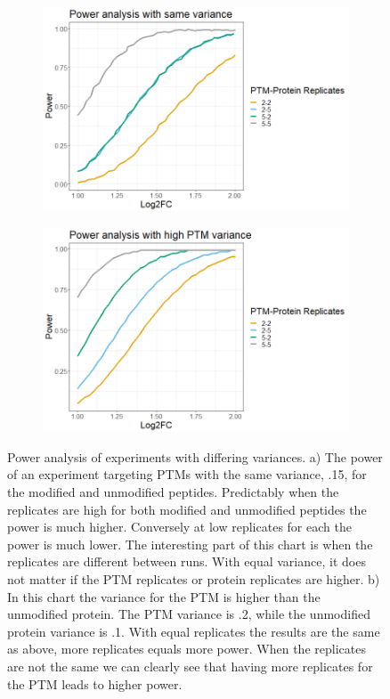 \documentclass[mcp]{article}
\numberwithin{table}{section}
\begin{document}
\begin{figure}[h!]
\centering
 \begin{subfigure}{\textwidth}
 \centering
	\includegraphics[width=.75\textwidth]{images/same_var_power}
	\caption{}
 \end{subfigure}\vspace{5mm}
 \begin{subfigure}{\textwidth}
 \centering
	\includegraphics[width=.75\textwidth]{images/high_ptm_var_power}
	\caption{}
 \end{subfigure}
 \caption{Power analysis of experiments with differing variances. a) The power of an experiment targeting PTMs with the same variance, .15, for the modified and unmodified peptides. Predictably when the replicates are high for both modified and unmodified peptides the power is much higher. Conversely at low replicates for each the power is much lower. The interesting part of this chart is when the replicates are different between runs. With equal variance, it does not matter if the PTM replicates or protein replicates are higher. b) In this chart the variance for the PTM is higher than the unmodified protein. The PTM variance is .2, while the unmodified protein variance is .1. With equal replicates the results are the same as above, more replicates equals more power. When the replicates are not the same we can clearly see that having more replicates for the PTM leads to higher power.}
\label{fig:power_sd_combo}
\end{figure}
\end{document}
